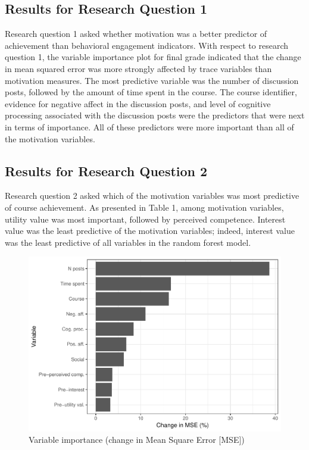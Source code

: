 \documentclass[acmart]{apa6}
\theoremstyle{definition}
\theoremstyle{definition}
\theoremstyle{definition}
\theoremstyle{remark}
\begin{document}
\subsection{Results for Research Question
1}\label{results-for-research-question-1}

Research question 1 asked whether motivation was a better predictor of
achievement than behavioral engagement indicators. With respect to
research question 1, the variable importance plot for final grade
indicated that the change in mean squared error was more strongly
affected by trace variables than motivation measures. The most
predictive variable was the number of discussion posts, followed by the
amount of time spent in the course. The course identifier, evidence for
negative affect in the discussion posts, and level of cognitive
processing associated with the discussion posts were the predictors that
were next in terms of importance. All of these predictors were more
important than all of the motivation variables.

\subsection{Results for Research Question
2}\label{results-for-research-question-2}

Research question 2 asked which of the motivation variables was most
predictive of course achievement. As presented in Table 1, among
motivation variables, utility value was most important, followed by
perceived competence. Interest value was the least predictive of the
motivation variables; indeed, interest value was the least predictive of
all variables in the random forest model.

\begin{figure}
\centering
\includegraphics{LAK_Manuscript_files/figure-latex/unnamed-chunk-4-1.pdf}
\caption{\label{fig:unnamed-chunk-4}Variable importance (change in Mean
Square Error {[}MSE{]})}
\end{figure}
\end{document}
